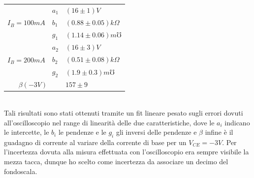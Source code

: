 \documentclass{amsart}
\begin{document}
    \begin{center}
        \begin{tabular}{|p{2cm}|p{1cm}|p{3cm}|}
            \hline
            \multirow{3}{*}{$I_B = 100mA$} & $a_1$ & $(16 \pm 1)V$ \\
                                        & $b_1$ & $(0.88 \pm 0.05) k \Omega$\\
                                        & $g_1$ & $(1.14 \pm 0.06) m \mho $\\
            \hline
            \multirow{3}{*}{$I_B = 200mA$} & $a_2$ & $(16 \pm 3)V$ \\
                                        & $b_2$ & $(0.51 \pm 0.08) k \Omega$\\
                                        & $g_2$ & $(1.9 \pm 0.3) m \mho $ \\
            \hline
            \multicolumn{2}{|c|}{$\beta(-3V)$} & $157\pm9$ \\
            \hline
        \end{tabular}
    \end{center}
    \hfill \\
    Tali risultati sono stati ottenuti tramite un fit lineare pesato sugli errori dovuti all'oscilloscopio nel range di linearità delle due caratteristiche,
    dove le $a_i$ indicano le intercette, le $b_i$ le pendenze e le $g_i$ gli inversi delle pendenze e $\beta$ infine è il guadagno di corrente al variare
    della corrente di base per un $V_{CE} = -3V$.  Per l'incertezza dovuta alla misura effettuata con l'oscilloscopio era sempre visibile la mezza tacca, dunque ho scelto 
    come incertezza da associare un decimo del fondoscala. 
\end{document}
